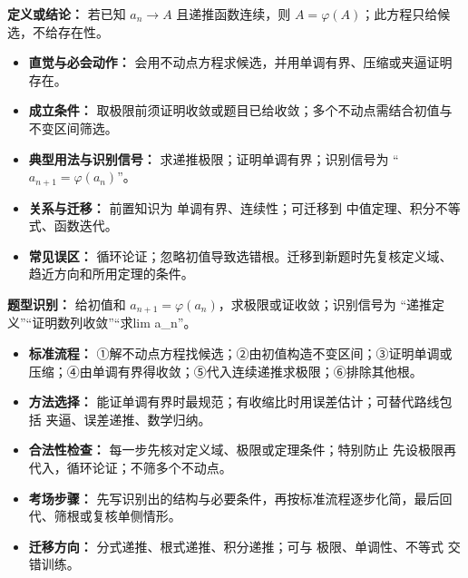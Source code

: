 \begin{knowledgeBox}
\textbf{定义或结论：} 若已知 $a_n\to A$ 且递推函数连续，则 $A=\varphi(A)$；此方程只给候选，不给存在性。

\begin{itemize}
  \item \textbf{直觉与必会动作：} 会用不动点方程求候选，并用单调有界、压缩或夹逼证明存在。
  \item \textbf{成立条件：} 取极限前须证明收敛或题目已给收敛；多个不动点需结合初值与不变区间筛选。
  \item \textbf{典型用法与识别信号：} 求递推极限；证明单调有界；识别信号为 “$a_{n+1}=\varphi(a_n)$”。
  \item \textbf{关系与迁移：} 前置知识为 单调有界、连续性；可迁移到 中值定理、积分不等式、函数迭代。
  \item \textbf{常见误区：} 循环论证；忽略初值导致选错根。迁移到新题时先复核定义域、趋近方向和所用定理的条件。
\end{itemize}
\end{knowledgeBox}

\begin{knowledgeBox}
\textbf{题型识别：} 给初值和 $a_{n+1}=\varphi(a_n)$，求极限或证收敛；识别信号为 “递推定义”“证明数列收敛”“求lim a\_n”。

\begin{itemize}
  \item \textbf{标准流程：} ①解不动点方程找候选；②由初值构造不变区间；③证明单调或压缩；④由单调有界得收敛；⑤代入连续递推求极限；⑥排除其他根。
  \item \textbf{方法选择：} 能证单调有界时最规范；有收缩比时用误差估计；可替代路线包括 夹逼、误差递推、数学归纳。
  \item \textbf{合法性检查：} 每一步先核对定义域、极限或定理条件；特别防止 先设极限再代入，循环论证；不筛多个不动点。
  \item \textbf{考场步骤：} 先写识别出的结构与必要条件，再按标准流程逐步化简，最后回代、筛根或复核单侧情形。
  \item \textbf{迁移方向：} 分式递推、根式递推、积分递推；可与 极限、单调性、不等式 交错训练。
\end{itemize}
\end{knowledgeBox}
